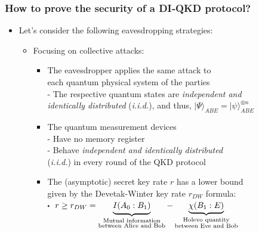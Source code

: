 \documentclass{beamer}
\newcommand\sbullet[1][.5]{\mathbin{\vcenter{\hbox{\scalebox{#1}{$\bullet$}}}}}
\begin{document}
		\begin{frame}
			\frametitle{\large How to prove the security of a DI‑QKD protocol?}

            \vspace{3ex}
            \begin{itemize}
                \item Let's consider the following eavesdropping strategies:
                \begin{itemize}
                    \item Focusing on collective attacks:
                    \begin{itemize}
                        \item The eavesdropper applies the same attack to\\ each quantum physical system of the parties\\
                        - The respective quantum states are \textit{independent and\\\hspace{0.5em}identically distributed} (\textit{i.i.d.}), and thus, ${|\Psi\rangle}_{ABE} = {|\psi\rangle}_{ABE}^{\otimes n}$
                        \item The quantum measurement devices\\
                        - Have no memory register\\
                        - Behave \textit{independent and identically distributed}\\\hspace{0.5em}(\textit{i.i.d.}) in every round of the QKD protocol
                        \vspace{2ex}
                        \item The (asymptotic) secret key rate $r$ has a lower bound\\ given by the Devetak-Winter key rate ${r}_{DW}$ formula:\\
                        $\sbullet$\, $r \geq {r}_{DW} = \underbrace{\strut I({A}_{0}:{B}_{1})}_{\substack{\text{Mutual information}\\ \text{between Alice and Bob}}} - \underbrace{\chi({B}_{1}:E)}_{\substack{\text{Holevo quantity}\\ \text{between Eve and Bob}}} $
                     \end{itemize}
                \end{itemize}
            \end{itemize}
		\end{frame}
\end{document}
